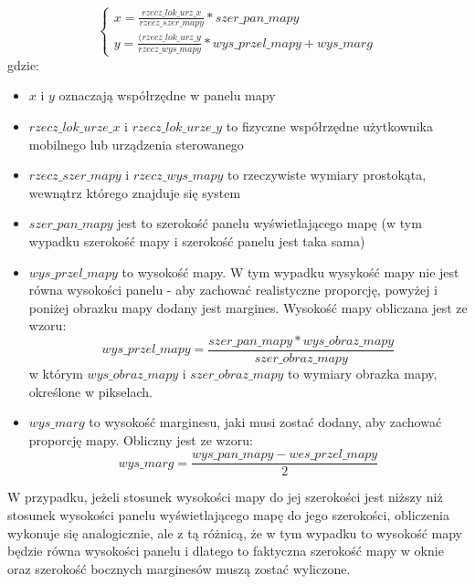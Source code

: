 \begin{equation}
\left\{
\begin{array}{l}
x = \frac{rzecz\_lok\_urz\_x}{rzecz\_szer\_mapy} * szer\_pan\_mapy \\
y = \frac{(rzecz\_lok\_urz\_y}{rzecz\_wys\_mapy} * wys\_przel\_mapy + wys\_marg 
\end{array}
\right.
\end{equation}
gdzie:
\begin{itemize}
	\item $x$ i $y$ oznaczają współrzędne w panelu mapy
	\item $rzecz\_lok\_urze\_x$ i $rzecz\_lok\_urze\_y$ to fizyczne współrzędne użytkownika mobilnego lub urządzenia sterowanego
	\item $rzecz\_szer\_mapy$ i $rzecz\_wys\_mapy$ to rzeczywiste wymiary prostokąta, wewnątrz którego znajduje się system
	\item $szer\_pan\_mapy$ jest to szerokość panelu wyświetlającego mapę (w tym wypadku szerokość mapy i szerokość panelu jest taka sama)
	\item $wys\_przel\_mapy$ to wysokość mapy. W tym wypadku wysykość mapy nie jest równa wysokości panelu - aby zachować realistyczne proporcję, powyżej i poniżej obrazku mapy dodany jest margines. Wysokość mapy obliczana jest ze wzoru:
	\begin{equation}
	wys\_przel\_mapy = \frac{szer\_pan\_mapy * wys\_obraz\_mapy}{szer\_obraz\_mapy}
	\end{equation}
	w którym $wys\_obraz\_mapy$ i $szer\_obraz\_mapy$ to wymiary obrazka mapy, określone w pikselach.
	\item $wys\_marg$ to wysokość marginesu, jaki musi zostać dodany, aby zachować proporcję mapy. Obliczny jest ze wzoru:
	\begin{equation}
	wys\_marg = \frac{wys\_pan\_mapy - wes\_przel\_mapy}{2}
	\end{equation}
\end{itemize}
W przypadku, jeżeli stosunek wysokości mapy do jej szerokości jest niższy niż stosunek wysokości panelu wyświetlającego mapę do jego szerokości, obliczenia wykonuje się analogicznie, ale z tą różnicą, że w tym wypadku to wysokość mapy będzie równa wysokości panelu i dlatego to faktyczna szerokość mapy w oknie oraz szerokość bocznych marginesów muszą zostać wyliczone.
